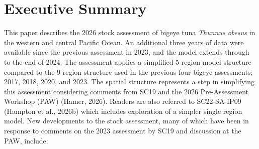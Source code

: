 \documentclass[
  english,
  a4paper,
  a4paper,
  11pt]{SCreport}
\begin{document}
\section{Executive Summary}\label{executive-summary}

This paper describes the 2026 stock assessment of bigeye tuna
\emph{Thunnus obesus} in the western and central Pacific Ocean. An
additional three years of data were available since the previous
assessment in 2023, and the model extends through to the end of 2024.
The assessment applies a simplified 5 region model structure compared to
the 9 region structure used in the previous four bigeye assessments;
2017, 2018, 2020, and 2023. The spatial structure represents a step in
simplifying this assessment considering comments from SC19 and the 2026
Pre-Assessment Workshop (PAW) (Hamer, 2026). Readers are also referred
to SC22-SA-IP09 (Hampton et al., 2026b) which includes exploration of a
simpler single region model. New developments to the stock assessment,
many of which have been in response to comments on the 2023 assessment
by SC19 and discussion at the PAW, include:
\end{document}
